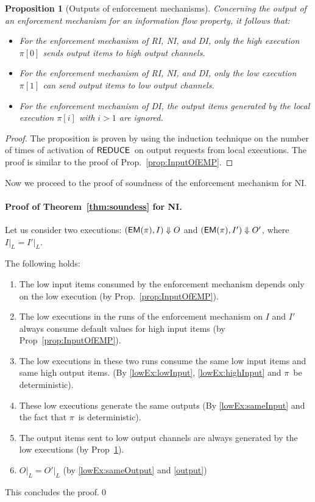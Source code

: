 \documentclass[10pt,a4paper,oneside]{article}
\newtheorem{proposition}{Proposition}[section]
\def\execution#1#2#3{\ensuremath{(#1, #2)\Downarrow#3}}
\def\loweq#1#2{\ensuremath{\restrict{#1}{L} = \restrict{#2}{L}}}
\def\restrict#1#2{\ensuremath{{#1}|_{#2}}}
\def\sanserif#1{\ensuremath{\sf #1}}
\def\REDUCE{\ensuremath{\sanserif{REDUCE}}}
\def\EM{\ensuremath{{\sanserif{EM}}}}
\def\Prog{\ensuremath{\pi}}
\def\Progl#1{\ensuremath{\Prog[#1]}}
\def\EMP{\ensuremath{\EM(}\ensuremath{\Prog)}}
\begin{document}
\begin{proposition}[Outputs of enforcement mechanisms]\label{prop:outputOfEMP}
Concerning the output of an enforcement mechanism for an information flow property, it follows that:
\begin{itemize}
\item For the enforcement mechanism of RI, NI, and DI, only the high execution \Progl{0} sends output items to high output channels.
\item For the enforcement mechanism of RI, NI,  and DI, only the low execution \Progl{1} can send output items to low output channels.
\item For the enforcement mechanism of DI, the output items generated by the local execution \Progl{i} with $i > 1$ are ignored.
\end{itemize}
\end{proposition}
\begin{proof}
The proposition is proven by using the induction technique on the number of times of activation of \REDUCE\ on  output requests from local executions. The proof is similar to the proof of Prop.~\ref{prop:InputOfEMP}.
\end{proof}



Now we proceed to the proof of soundness of the enforcement mechanism for NI.
\paragraph{Proof of Theorem~\ref{thm:soundess} for NI.}

Let us consider two executions: \execution{\EMP}{I}{O} and \execution{\EMP}{I'}{O'}, where \loweq{I}{I'}.  

The following holds:


\begin{enumerate}
\item The low input items consumed by the enforcement mechanism depends only on the low execution (by Prop.~\ref{prop:InputOfEMP}). \label{lowEx:lowInput}

\item The low executions in the runs of the enforcement mechanism on $I$ and $I'$ always consume default values for high input items (by Prop~\ref{prop:InputOfEMP}). \label{lowEx:highInput}

\item  The low executions in these two runs consume the same low input items and same high output items. (By \ref{lowEx:lowInput}, \ref{lowEx:highInput} and \Prog\ be deterministic).  \label{lowEx:sameInput}

\item These low executions generate the same outputs (By \ref{lowEx:sameInput} and the fact that \Prog\ is deterministic). \label{lowEx:sameOutput}

\item The output items sent to low output channels are always generated by the low executions (by Prop~\ref{prop:outputOfEMP}). \label{output}

\item \loweq{O}{O'} (by \ref{lowEx:sameOutput} and \ref{output})
\end{enumerate}
This concludes the proof.\qed
\end{document}

